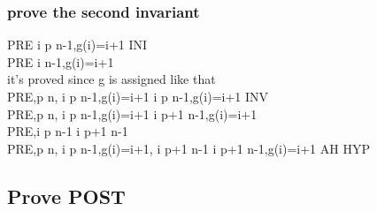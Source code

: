 \documentclass[11pt,a4paper,fleqn]{article}
\begin{document}
\subsubsection{prove the second invariant}
\noindent
PRE \vdash [g:=( \{0\} \domsub f)\cup \{n-1 \mapsto n\},p:=1]\forall i \in p \upto n-1,g(i)=i+1  \;INI \\
PRE \vdash [g:=( \{0\} \domsub f)\cup \{n-1 \mapsto n\}]\forall i  \upto n-1,g(i)=i+1 \\
it's \; proved \; since \; g \; is \; assigned \; like \; that \\
PRE,p \neq n, \forall i \in p \upto n-1,g(i)=i+1 \vdash [g(p):=p-1,p:=p+1]\forall i \in p \upto n-1,g(i)=i+1 \; INV \\
PRE,p \neq n, \forall i \in p \upto n-1,g(i)=i+1 \vdash [g(p):=p-1]\forall i \in p+1 \upto n-1,g(i)=i+1 \\
PRE,\forall i \in p \upto n-1 \vdash i \in p+1 \upto n-1 \\
PRE,p \neq n, \forall i \in p \upto n-1,g(i)=i+1, \forall i \in p+1 \upto n-1 \vdash [g(p):=p-1]\forall i \in p+1 \upto n-1,g(i)=i+1 \;AH \;HYP \\
\subsection{Prove POST}



%
%
\end{document}
